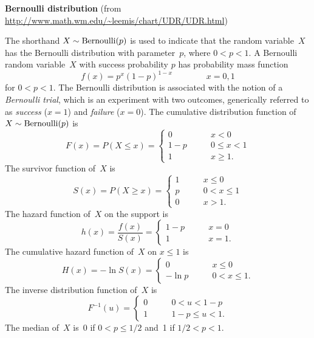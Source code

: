 \documentclass[12pt,fullpage]{article}
\begin{document}
\noindent
{\bf Bernoulli distribution} (from \color{blue}\url{http://www.math.wm.edu/~leemis/chart/UDR/UDR.html}\color{black})

\noindent
The shorthand $X \sim {\rm Bernoulli}(p)$ is used to indicate that the
random variable~$X$ has the Bernoulli distribution with parameter~$p$,
where $0 < p < 1$.
A Bernoulli random variable~$X$ with success probability $p$ has
probability mass function 
$$
f(x) = p ^ {x} (1 - p) ^ {1 - x} \qquad \qquad x = 0, 1
$$
for $0 < p < 1$.
The Bernoulli distribution is associated with the notion of a {\it Bernoulli trial},
which is an experiment with two outcomes, generically referred to as {\it success\/} ($x = 1$)
and {\it failure} ($x = 0$).
The cumulative distribution function of $X \sim {\rm Bernoulli}(p)$ is
$$
F(x) = P(X \le x) = 
       \left\{
       \begin{array}{lll}
         0 & \qquad x < 0 \\
         1 - p & \qquad 0 \leq x < 1 \\
         1 & \qquad x \geq 1.
       \end{array}
       \right.
$$
The survivor function of~$X$ is
$$
S(x) = P(X \ge x) =
       \left\{
       \begin{array}{lll}
         1 & \qquad x \le 0 \\
         p & \qquad 0 < x \le 1 \\
         0 & \qquad x > 1.
     \end{array}
     \right.
$$
The hazard function of~$X$ on the support is 
$$
h(x) = \frac{f(x)}{S(x)} =
       \left\{
       \begin{array}{lll}
         1 - p & \qquad x = 0 \\
         1 & \qquad x = 1.
       \end{array}
       \right.
$$
The cumulative hazard function of~$X$ on $x \le 1$ is 
$$
H(x) = -\ln S(x) =
       \left\{
       \begin{array}{lll}
         0 & \qquad x \le 0 \\
         -\ln p & \qquad 0 < x \le 1.
       \end{array}
       \right.
$$
The inverse distribution function of~$X$ is
$$
F ^ {-1}(u) = 
              \left\{
              \begin{array}{lll}
                0 & \qquad 0 < u < 1 - p \\ 
                1 & \qquad 1 - p \le u < 1.
              \end{array}
              \right.
$$
The median of~$X$ is~0 if $0 < p \le 1/2$ and~1 if $1/2 < p < 1$.
\end{document}
